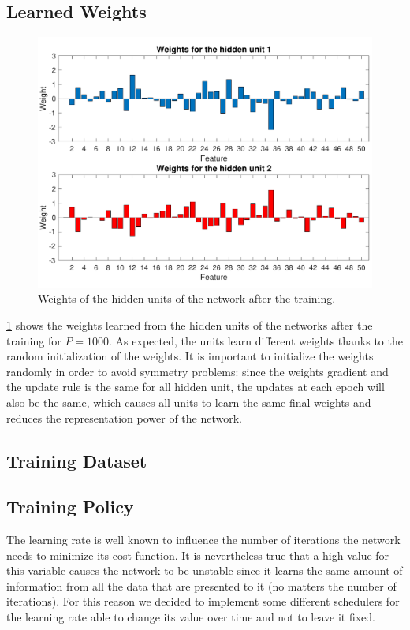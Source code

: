 \subsection{Learned Weights}
\begin{figure}[t]
	\centering
	\includegraphics[width=\columnwidth]{figures/weights_p_1000}
    \caption{Weights of the hidden units of the network after the training.}
	\label{fig:weights}
\end{figure}

\cref{fig:weights} shows the weights learned from the hidden units of the networks after the training for $P = 1000$.
As expected, the units learn different weights thanks to the random initialization of the weights.
It is important to initialize the weights randomly in order to avoid symmetry problems:
since the weights gradient and the update rule is the same for all hidden unit, the updates at each epoch will also be the same, which causes all units to learn the same final weights and reduces the representation power of the network.

\subsection{Training Dataset}

\subsection{Training Policy}
The learning rate is well known to influence the number of iterations the network needs to minimize
its cost function. It is nevertheless true that a high value for this variable causes the network to
be unstable since it learns the same amount of information from all the data that are presented to it (no matters the number of iterations).
For this reason we decided to implement some different schedulers for the learning rate able to change its
value over time and not to leave it fixed.

